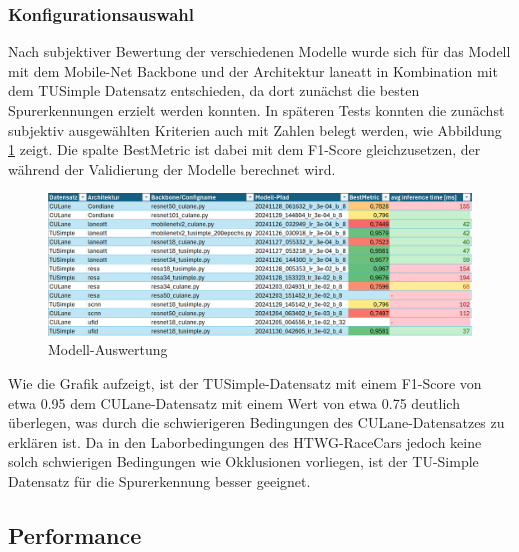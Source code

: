 \documentclass{article}
\begin{document}
            \subsubsection{Konfigurationsauswahl}
                Nach subjektiver Bewertung der verschiedenen Modelle wurde sich für das Modell mit dem Mobile-Net Backbone und der Architektur laneatt in Kombination mit dem TUSimple Datensatz entschieden, da dort zunächst die besten Spurerkennungen erzielt werden konnten.
                In späteren Tests konnten die zunächst subjektiv ausgewählten Kriterien auch mit Zahlen belegt werden, wie Abbildung \ref{fig:Modell_Auswertung} zeigt.
                Die spalte BestMetric ist dabei mit dem F1-Score gleichzusetzen, der während der Validierung der Modelle berechnet wird.
                \begin{figure}[h!]
                    \includegraphics[width=\linewidth]{Auswertung_BackBone_Datensatz.png}
                    \caption{Modell-Auswertung}
                    \label{fig:Modell_Auswertung}
                \end{figure}
                Wie die Grafik aufzeigt, ist der TUSimple-Datensatz mit einem F1-Score von etwa 0.95 dem CULane-Datensatz mit einem Wert von etwa 0.75 deutlich überlegen, was durch die schwierigeren Bedingungen des CULane-Datensatzes zu erklären ist. Da in den Laborbedingungen des HTWG-RaceCars jedoch keine solch schwierigen Bedingungen wie Okklusionen vorliegen, ist der TU-Simple Datensatz für die Spurerkennung besser geeignet.

        \subsection{Performance}

            
\end{document}
